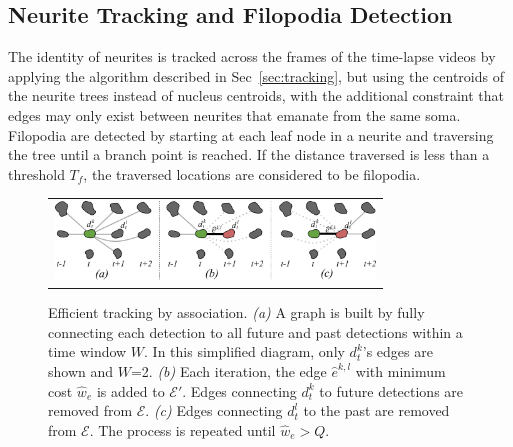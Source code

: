 \subsection{Neurite Tracking and Filopodia Detection}
\label{sec:neurite}
\vspace{-2mm}  The identity  of neurites  is tracked  across the  frames  of the
time-lapse videos by applying the algorithm described in Sec~\ref{sec:tracking},
but using the centroids of the  neurite trees instead of nucleus centroids, with
the  additional constraint  that  edges  may only  exist  between neurites  that
emanate from  the same soma.   Filopodia are detected  by starting at  each leaf
node in a  neurite and traversing the  tree until a branch point  is reached. If
the distance traversed  is less than a threshold  $T_f$, the traversed locations
are considered to be filopodia.


\begin{figure}[t]
  \centering
       \begin{tabular}{@{\hspace{-1mm}}c@{}}
        \includegraphics[width = 85mm] {images/greedytracking.pdf}\\ [-2.4ex]
       \end{tabular} 
    \caption{ \footnotesize Efficient tracking by association.  {\em  (a)} A graph is
	built by fully connecting each detection to all future and past detections within  a time  window  $W$.
	In this simplified diagram, only  $d^k_t$'s edges  are
	shown and $W$=2. {\em  (b)} Each iteration,  the edge $\hat{e}^{k,l}$
        with   minimum  cost   $\hat{w}_e$  is  added  to $\mathcal{E}'$.   Edges  connecting
        $d^k_t$ to  future detections are  removed from $\mathcal{E}$.
        {\em  (c)} Edges  connecting  $d^l_t$ to  the past  are
        removed from $\mathcal{E}$.  The process is repeated until $\hat w_e > Q$. }
    \label{fig:greedytracking}
\end{figure}


